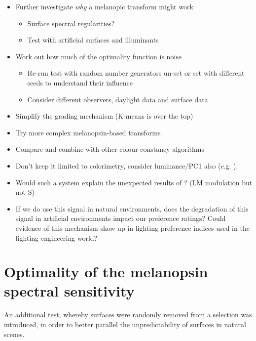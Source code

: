 \begin{itemize}
\item Further investigate \emph{why} a melanopic transform might work
\begin{itemize}
\item Surface spectral regularities?
\item Test with artificial surfaces and illuminants
\end{itemize}
\item Work out how much of the optimality function is noise
\begin{itemize}
\item Re-run test with random number generators un-set or set with different seeds to understand their influence
\item Consider different observers, daylight data and surface data
\end{itemize}
\item Simplify the grading mechanism (K-means is over the top)
\item Try more complex melanopsin-based transforms
\item Compare and combine with other colour constancy algorithms
\item Don't keep it limited to colorimetry, consider luminance/PC1 also (e.g. \citet{chakrabarti_color_2015}). 
\item Would such a system explain the unexpected results of \citet{cao_evidence_2018}? (LM modulation but not S)
\item If we do use this signal in natural environments, does the degradation of this signal in artificial environments impact our preference ratings? Could evidence of this mechanism show up in lighting preference indices used in the lighting engineering world?
\end{itemize}


\section{Optimality of the melanopsin spectral sensitivity}

An additional test, whereby surfaces were randomly removed from a selection was introduced, in order to better parallel the unpredictability of surfaces in natural scenes.





